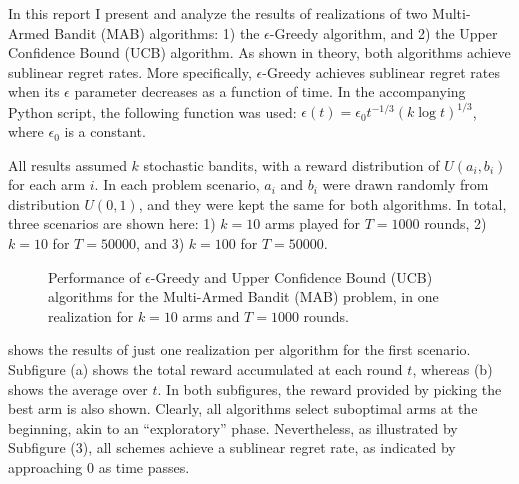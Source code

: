 In this report I present and analyze the results of realizations of two Multi-Armed Bandit (MAB) algorithms: 1) the $\epsilon$-Greedy algorithm, and 2) the Upper Confidence Bound (UCB) algorithm. As shown in theory, both algorithms achieve sublinear regret rates. More specifically, $\epsilon$-Greedy achieves sublinear regret rates when its $\epsilon$ parameter decreases as a function of time. In the accompanying Python script, the following function was used: $\epsilon(t)=\epsilon_0 t^{-1/3} (k\log t)^{1/3}$, where $\epsilon_0$ is a constant.

All results assumed $k$ stochastic bandits, with a reward distribution of $U(a_i,b_i)$ for each arm $i$. In each problem scenario, $a_i$ and $b_i$ were drawn randomly from distribution $U(0,1)$, and they were kept the same for both algorithms. In total, three scenarios are shown here: 1) $k=10$ arms played for $T=1000$ rounds, 2) $k=10$ for $T=50000$, and 3) $k=100$ for $T=50000$.

\begin{figure}[htpb]
\renewcommand*\thesubfigure{\alph{subfigure}}
\centering
\caption{Performance of $\epsilon$-Greedy and Upper Confidence Bound (UCB) algorithms for the Multi-Armed Bandit (MAB) problem, in one realization for $k=10$ arms and $T=1000$ rounds.}
\label{fig:1}
\end{figure}

 shows the results of just one realization per algorithm for the first scenario. Subfigure (a) shows the total reward accumulated at each round $t$, whereas (b) shows the average over $t$. In both subfigures, the reward provided by picking the best arm is also shown. Clearly, all algorithms select suboptimal arms at the beginning, akin to an ``exploratory'' phase. Nevertheless, as illustrated by Subfigure (3), all schemes achieve a sublinear regret rate, as indicated by approaching 0 as time passes.

